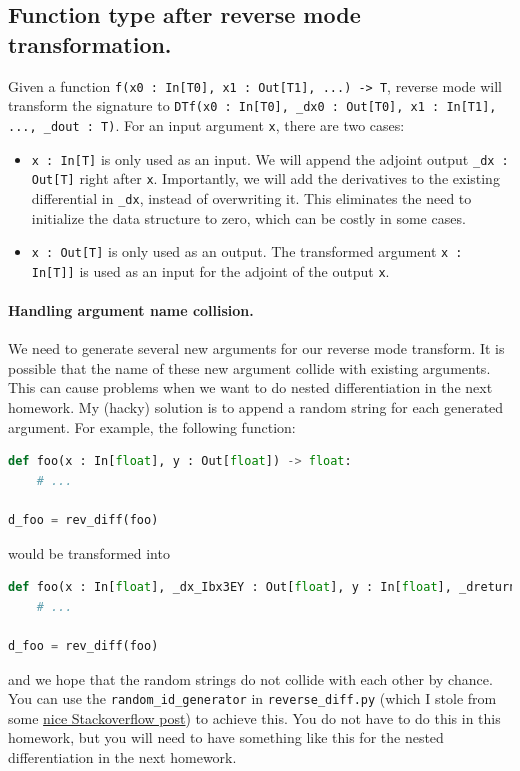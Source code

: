 \subsection{Function type after reverse mode transformation.}
\label{sec:reversemodespec}

Given a function \lstinline{f(x0 : In[T0], x1 : Out[T1], ...) -> T}, reverse mode will transform the signature to \lstinline{DTf(x0 : In[T0], _dx0 : Out[T0], x1 : In[T1], ..., _dout : T)}. For an input argument \lstinline{x}, there are two cases:
\begin{itemize}
	\item \lstinline{x : In[T]} is only used as an input. We will append the adjoint output \lstinline{_dx : Out[T]} right after \lstinline{x}. Importantly, we will add the derivatives to the existing differential in \lstinline{_dx}, instead of overwriting it. This eliminates the need to initialize the data structure to zero, which can be costly in some cases.
	\item \lstinline{x : Out[T]} is only used as an output. The transformed argument \lstinline{x : In[T]]} is used as an input for the adjoint of the output \lstinline{x}.
\end{itemize}

\paragraph{Handling argument name collision.} We need to generate several new arguments for our reverse mode transform. It is possible that the name of these new argument collide with existing arguments. This can cause problems when we want to do nested differentiation in the next homework. My (hacky) solution is to append a random string for each generated argument. For example, the following function:
\begin{lstlisting}[language=Python]
def foo(x : In[float], y : Out[float]) -> float:
    # ...

d_foo = rev_diff(foo)
\end{lstlisting}
would be transformed into
\begin{lstlisting}[language=Python]
def foo(x : In[float], _dx_Ibx3EY : Out[float], y : In[float], _dreturn_W7TFYQ : In[float]):
    # ...

d_foo = rev_diff(foo)
\end{lstlisting}
and we hope that the random strings do not collide with each other by chance. You can use the \lstinline{random_id_generator} in \lstinline{reverse_diff.py} (which I stole from some \href{https://stackoverflow.com/questions/2257441/random-string-generation-with-upper-case-letters-and-digits}{nice Stackoverflow post}) to achieve this. You do not have to do this in this homework, but you will need to have something like this for the nested differentiation in the next homework.

